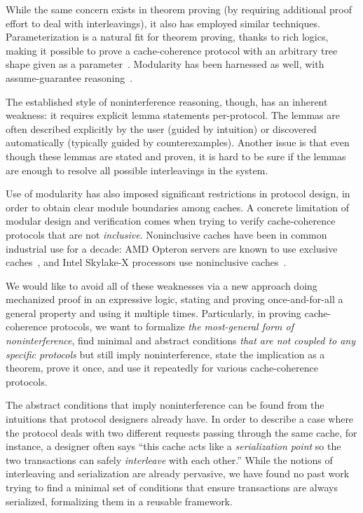 While the same concern exists in theorem proving (by requiring additional proof effort to deal with interleavings), it also has employed similar techniques.
Parameterization is a natural fit for theorem proving, thanks to rich logics, making it possible to prove a cache-coherence protocol with an arbitrary tree shape given as a parameter~\cite{Murali:2015}.
Modularity has been harnessed as well, \eg{} with assume-guarantee reasoning~\cite{McMillan:2016}.

The established style of noninterference reasoning, though, has an inherent weakness: it requires explicit lemma statements per-protocol.
The lemmas are often described explicitly by the user (guided by intuition) or discovered automatically (typically guided by counterexamples).
Another issue is that even though these lemmas are stated and proven, it is hard to be sure if the lemmas are enough to resolve all possible interleavings in the system.

Use of modularity has also imposed significant restrictions in protocol design, in order to obtain clear module boundaries among caches.
A concrete limitation of modular design and verification comes when trying to verify cache-coherence protocols that are not \emph{inclusive}.
Noninclusive caches have been in common industrial use for a decade: AMD Opteron servers are known to use exclusive caches~\cite{Irazoqui:2016}, and Intel Skylake-X processors use noninclusive caches~\cite{intel-non-inclusive,Zhao:2010,Yan:2019}.

We would like to avoid all of these weaknesses via a new approach doing mechanized proof in an expressive logic, stating and proving once-and-for-all a general property and using it multiple times.
Particularly, in proving cache-coherence protocols, we want to formalize \emph{the most-general form of noninterference}, find minimal and abstract conditions \emph{that are not coupled to any specific protocols} but still imply noninterference, state the implication as a theorem, prove it once, and use it repeatedly for various cache-coherence protocols.

The abstract conditions that imply noninterference can be found from the intuitions that protocol designers already have.
In order to describe a case where the protocol deals with two different requests passing through the same cache, for instance, a designer often says ``this cache acts like a \emph{serialization point} so the two transactions can safely \emph{interleave} with each other.''
While the notions of interleaving and serialization are already pervasive, we have found no past work trying to find a minimal set of conditions that ensure transactions are always serialized, formalizing them in a reusable framework.

